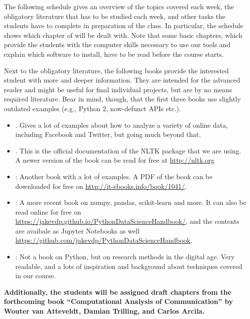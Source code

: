 
The following schedule gives an overview of the topics covered each week, the obligatory literature that has to be studied each week, and other tasks the students have to complete in preparation of the class.
In particular, the schedule shows which chapter of \cite{Trilling2016} will be dealt with. Note that some basic chapters, which provide the students with the computer skills necessary to use our tools and explain which software to install, have to be read before the course starts.

Next to the obligatory literature, the following books provide the interested student with more and deeper information. They are intended for the advanced reader and might be useful for final individual projects, but are by no means required literature. Bear in mind, though, that the first three books use slightly outdated examples (e.g., Python 2, now-defunct APIs etc.).

\begin{itemize}
\item \citealp{Russel2013}. Gives a lot of examples about how to analyze a variety of online data, including Facebook and Twitter, but going much beyond that.
\item \citealp{Bird2009}. This is the official documentation of the NLTK package that we are using. A newer version of the book can be read for free at \url{http://nltk.org}
\item \citealp{McKinney2012}: Another book with a lot of examples. A PDF of the book can be downloaded for free on \url{http://it-ebooks.info/book/1041/}.
\item \citealp{VanderPlas2016}: A more recent book on numpy, pandas, scikit-learn and more. It can also be read online for free on \url{https://jakevdp.github.io/PythonDataScienceHandbook/}, and the contents are avaibale as Jupyter Notebooks as well \url{https://github.com/jakevdp/PythonDataScienceHandbook}.
\item \citealp{Salganik2017}: Not a book on Python, but on research methods in the digital age. Very readable, and a lots of inspiration and background about techniques covered in our course.
\end{itemize}

\textbf{Additionally, the students will be assigned draft chapters from the forthcoming book ``Computational Analysis of Communication'' by Wouter van Atteveldt, Damian Trilling, and Carlos Arcila.}

